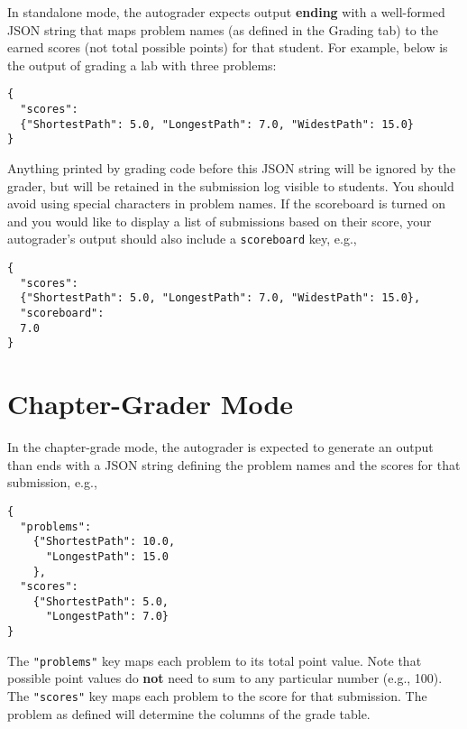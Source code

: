 \begin{gram}
\label{sec:codelabs::standalone::output}

In standalone mode, the autograder expects output \textbf{ending} with
a well-formed JSON string that maps problem names (as defined in the
    Grading tab) to the earned scores (not total possible points) for that student. For example,
    below is the output of grading a lab with three problems:
  
\begin{lstlisting}
{
  "scores":
  {"ShortestPath": 5.0, "LongestPath": 7.0, "WidestPath": 15.0}
}
\end{lstlisting}

Anything printed by grading code before this JSON string will be ignored by the
grader, but will be retained in the submission log visible to students. 
You should avoid using special characters in problem names.
If the scoreboard is turned on and you would like to display a list of
submissions based on their score, your autograder's output should also include a \lstinline`scoreboard` key, e.g.,


\begin{lstlisting}
{
  "scores":
  {"ShortestPath": 5.0, "LongestPath": 7.0, "WidestPath": 15.0},
  "scoreboard": 
  7.0  
}
\end{lstlisting}
  
\end{gram}


\section{Chapter-Grader Mode}
\label{sec:codelabs::chapter}

\begin{gram}
\label{sec:codelabs::chapter::output}
  
In the chapter-grade mode, the autograder is expected to generate an
output than ends with a JSON string defining the problem names and the
scores for that submission, e.g.,
  
\begin{lstlisting}
{
  "problems":
    {"ShortestPath": 10.0,
      "LongestPath": 15.0
    },
  "scores":
    {"ShortestPath": 5.0,
      "LongestPath": 7.0}
}
\end{lstlisting}

The \lstinline`"problems"` key maps each problem to its total point value. Note
that possible point values do \textbf{not} need to sum to any particular number (e.g., 100).
The \lstinline`"scores"` key maps each problem to the score for that submission.
The problem as defined will determine the columns of the grade table.
\end{gram}

